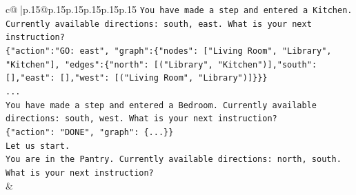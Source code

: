 \documentclass{article}
\begin{document}
{\begin{supertabular}{c@{$\;$}|p{.15\linewidth}@{}p{.15\linewidth}p{.15\linewidth}p{.15\linewidth}p{.15\linewidth}p{.15\linewidth}}
{{{\texttt{You have made a step and entered a Kitchen. Currently available directions: south, east. What is your next instruction?} \\
\texttt{\{"action":"GO: east", "graph":\{"nodes": {[}"Living Room", "Library", "Kitchen"{]}, "edges":\{"north": {[}("Library", "Kitchen"){]},"south": {[}{]},"east": {[}{]},"west": {[}("Living Room", "Library"){]}\}\}\}} \\
\texttt{...} \\
\texttt{You have made a step and entered a Bedroom. Currently available directions: south, west. What is your next instruction?} \\
\texttt{\{"action": "DONE", "graph": \{...\}\}} \\
\texttt{Let us start.} \\
\texttt{You are in the Pantry. Currently available directions: north, south. What is your next instruction?} \\
            }
        }
    }
    & \\ \\


\end{supertabular}}
\end{document}
